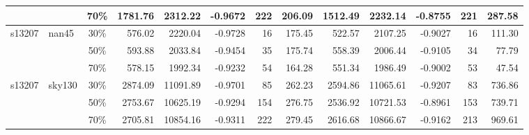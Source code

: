 \begin{table}[htbp]
{\begin{tabular}{llc|rrrrr|rrrrr}
             &              & 70\% & 1781.76 & 2312.22 & -0.9672 & 222  & 206.09 & 1512.49 & 2232.14 & -0.8755 & 221  & 287.58 \\
\midrule
s13207       & nan45        & 30\% & 576.02 & 2220.04 & -0.9728 & 16   & 175.45 & 522.57 & 2107.25 & -0.9027 & 16   & 111.30 \\
             &              & 50\% & 593.88 & 2033.84 & -0.9454 & 35   & 175.74 & 558.39 & 2006.44 & -0.9105 & 34   & 77.79 \\
             &              & 70\% & 578.15 & 1992.34 & -0.9232 & 54   & 164.28 & 551.34 & 1986.49 & -0.9002 & 53   & 47.54 \\
\midrule
s13207       & sky130       & 30\% & 2874.09 & 11091.89 & -0.9701 & 85   & 262.23 & 2594.86 & 11065.61 & -0.9207 & 83   & 736.86 \\
             &              & 50\% & 2753.67 & 10625.19 & -0.9294 & 154  & 276.75 & 2536.92 & 10721.53 & -0.8961 & 153  & 739.71 \\
             &              & 70\% & 2705.81 & 10854.16 & -0.9311 & 222  & 279.45 & 2616.68 & 10866.67 & -0.9162 & 213  & 969.61 \\
\bottomrule
\end{tabular}
}
\label{tab:optimization_results}
\end{table}
